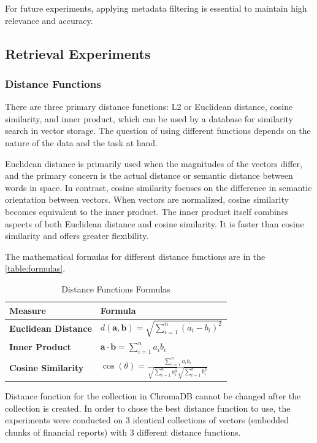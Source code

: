 For future experiments, applying metadata filtering is essential to maintain high relevance and accuracy. 

\subsection{Retrieval Experiments}
\subsubsection{Distance Functions}
There are three primary distance functions: L2 or Euclidean distance, cosine similarity, and inner product, which can be used by a database for similarity search in vector storage.  The question of using different functions depends on the nature of the data and the task at hand.

Euclidean distance is primarily used when the magnitudes of the vectors differ, and the primary concern is the actual distance or semantic distance between words in space. In contrast, cosine similarity focuses on the difference in semantic orientation between vectors. When vectors are normalized, cosine similarity becomes equivalent to the inner product. The inner product itself combines aspects of both Euclidean distance and cosine similarity. It is faster than cosine similarity and offers greater flexibility.

The mathematical formulas for different distance functions are in the \autoref{table:formulas}.
\begin{table}[h!]
\renewcommand{\arraystretch}{2.5}
\centering
\begin{tabular}{|>{\centering\arraybackslash}m{4cm}|>{\centering\arraybackslash}m{9cm}|}
\hline
\textbf{Measure} & \textbf{Formula} \\ \hline
\textbf{Euclidean Distance} & \( d(\mathbf{a}, \mathbf{b}) = \sqrt{\sum_{i=1}^{n} (a_i - b_i)^2} \) \\ \hline
\textbf{Inner Product} & \( \mathbf{a} \cdot \mathbf{b} = \sum_{i=1}^{n} a_i b_i \) \\ \hline
\textbf{Cosine Similarity} & \( \cos(\theta) = \frac{\sum_{i=1}^{n} a_i b_i}{\sqrt{\sum_{i=1}^{n} a_i^2} \sqrt{\sum_{i=1}^{n} b_i^2}} \) \\ \hline
\end{tabular}
\caption{Distance Functions Formulas}
\label{table:formulas}
\end{table}

Distance function for the collection in ChromaDB cannot be changed after the collection is created. In order to chose the best distance function to use, the experiments were conducted on 3 identical collections of vectors (embedded chunks of financial reports) with 3 different distance functions.

